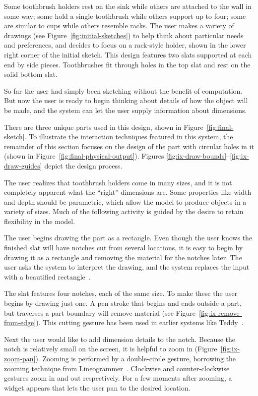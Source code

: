 \documentclass[12pt]{article}
\begin{document}
Some toothbrush holders rest on the sink while others are attached to
the wall in some way; some hold a single toothbrush while others
support up to four; some are similar to cups while others resemble
racks. The user makes a variety of drawings (see
Figure~\ref{fig:initial-sketches}) to help think about particular
needs and preferences, and decides to focus on a rack-style holder,
shown in the lower right corner of the initial sketch. This design
features two slats supported at each end by side pieces. Toothbrushes
fit through holes in the top slat and rest on the solid bottom slat.

So far the user had simply been sketching without the benefit of
computation. But now the user is ready to begin thinking about details
of how the object will be made, and the system can let the user supply
information about dimensions.

There are three unique parts used in this design, shown in
Figure~\ref{fig:final-sketch}. To illustrate the interaction
techniques featured in this system, the remainder of this section
focuses on the design of the part with circular holes in it (shown in
Figure~\ref{fig:final-physical-output}). Figures
\ref{fig:ix-draw-bounds}--\ref{fig:ix-draw-guides} depict the design
process.

The user realizes that toothbrush holders come in many sizes, and it
is not completely apparent what the ``right'' dimensions are. Some
properties like width and depth should be parametric, which allow the
model to produce objects in a variety of sizes. Much of the following
activity is guided by the desire to retain flexibility in the model.

The user begins drawing the part as a rectangle. Even though the user
knows the finished slat will have notches cut from several locations,
it is easy to begin by drawing it as a rectangle and removing the
material for the notches later. The user asks the system to interpret
the drawing, and the system replaces the input with a beautified
rectangle~\cite{pavlidis-beautifier}.

The slat features four notches, each of the same size. To make these
the user begins by drawing just one. A pen stroke that begins and ends
outside a part, but traverses a part boundary will remove material
(see Figure~\ref{fig:ix-remove-from-edge}). This cutting gesture has
been used in earlier systems like Teddy~\cite{igarashi-teddy}.

Next the user would like to add dimension details to the
notch. Because the notch is relatively small on the screen, it is
helpful to zoom in (Figure~\ref{fig:ix-zoom-pan}). Zooming is
performed by a double-circle gesture, borrowing the zooming
technique from Lineogrammer~\cite{zeleznik-lineogrammer}. Clockwise
and counter-clockwise gestures zoom in and out respectively. For a few
moments after zooming, a widget appears that lets the user pan to the
desired location.
\end{document}
